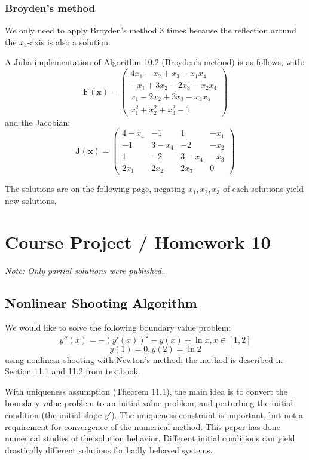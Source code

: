 \documentclass[12pt]{article} %
\newcommand{\1}[1]{\mathds{1}\left[#1\right]}
\begin{document}
\subsubsection{Broyden's method}
We only need to apply Broyden's method 3 times because the reflection around the $x_4$-axis is also a solution.

A Julia implementation of Algorithm 10.2 (Broyden's method) is as follows, with:
$$
	\mathbf{F}(\mathbf{x}) = 
	\begin{pmatrix}
		4x_1 - x_2 + x_3-x_1x_4\\
		-x_1+3x_2-2x_3 -x_2x_4\\
		x_1-2x_2+3x_3 - x_3x_4\\
		x_1^2+x_2^2+x_3^2-1
	\end{pmatrix}
$$ and the Jacobian:
$$
	\mathbf{J}(\mathbf{x}) = 
	\begin{pmatrix}
	4-x_4 & -1 & 1 & -x_1\\
	-1 & 3-x_4 & -2 & -x_2\\
	1 & -2 & 3-x_4 & -x_3\\
	2x_1 & 2x_2 & 2x_3 & 0
	\end{pmatrix}
$$

The solutions are on the following page, negating $x_1, x_2, x_3$ of each solutions yield new solutions.



\newpage
\section{Course Project / Homework 10}
\emph{Note: Only partial solutions were published.}
\subsection{Nonlinear Shooting Algorithm}
We would like to solve the following boundary value problem:
$$
	y''(x) = -(y'(x))^2 - y(x)+\ln x, x\in [1,2]
$$
$$
	y(1) = 0, y(2) = \ln 2
$$ using nonlinear shooting with Newton's method; the method is described in Section 11.1 and 11.2 from textbook.

With uniqueness assumption (Theorem 11.1), the main idea is to convert the boundary value problem to an initial value problem, and perturbing the initial condition (the initial slope $y'$). The uniqueness constraint is important, but not a requirement for convergence of the numerical method. \href{https://www.sciencedirect.com/science/article/pii/S0898122101002504}{\color{blue}This paper} has done numerical studies of the solution behavior. Different initial conditions can yield drastically different solutions for badly behaved systems.
\end{document}
